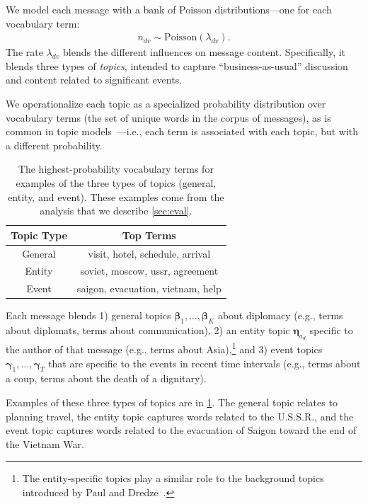 We model each message with a bank of Poisson distributions---one for
each vocabulary term:
\begin{align}
  n_{dv} \sim \textrm{Poisson}\left(\lambda_{dv}\right).
\end{align}
The rate $\lambda_{dv}$ blends the different influences on message
content. Specifically, it blends three types of \emph{topics},
intended to capture ``business-as-usual'' discussion and content
related to significant events.

We operationalize each topic as a specialized probability distribution
over vocabulary terms (the set of unique words in the corpus of
messages), as is common in topic
models~\cite{Blei:2003,canny2004gap,Gopalan:2014b}---i.e., each term
is associated with each topic, but with a different probability.

\begin{table}
\centering
\small
\begin{tabular}{cc}
\toprule
\textbf{Topic Type} & \textbf{Top Terms} \\
\midrule
General & visit, hotel, schedule, arrival \\
Entity & soviet, moscow, ussr, agreement \\
Event & saigon, evacuation, vietnam, help \\
\bottomrule
\end{tabular}
\caption{The highest-probability vocabulary terms for examples of the
  three types of topics (general, entity, and event). These examples
  come from the analysis that we describe \cref{sec:eval}.}
\label{tab:3topics}
\end{table}

Each message blends 1) general topics $\mathbold{\beta}_1, \ldots,
\mathbold{\beta}_K$ about diplomacy (e.g., terms about diplomats,
terms about communication), 2) an entity topic $\mathbold{\eta}_{a_d}$
specific to the author of that message (e.g., terms about
Asia),\footnote{The entity-specific topics play a similar role to the
  background topics introduced by Paul and
  Dredze~.} and 3) event topics
$\mathbold{\gamma}_1, \ldots, \mathbold{\gamma}_T$ that are specific
to the events in recent time intervals (e.g., terms about a coup,
terms about the death of a dignitary).

Examples of these three types of topics are in \cref{tab:3topics}. The
general topic relates to planning travel, the entity topic captures
words related to the U.S.S.R., and the event topic captures words
related to the evacuation of Saigon toward the end of the Vietnam War.


